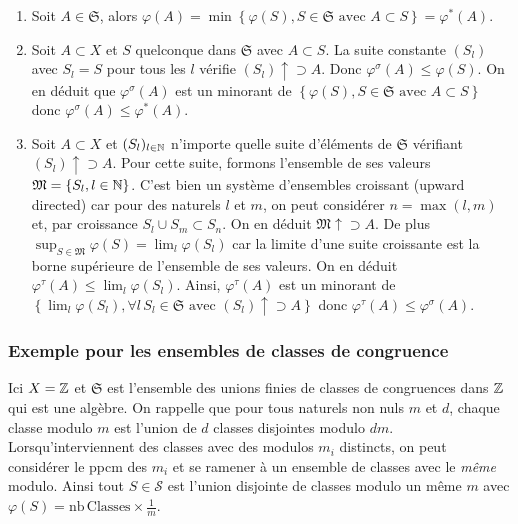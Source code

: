 \begin{demo}
 \begin{enumerate}
  \item Soit $A \in \mathfrak{S}$, alors $\varphi(A)= \min \left\lbrace \varphi(S), S \in \mathfrak{S} \text{ avec } A \subset S \right\rbrace = \varphi^*(A)$.
  \item Soit $A \subset X$ et $S$ quelconque dans $\mathfrak{S}$ avec $A \subset S$. La suite constante $(S_l)$ avec $S_l = S$ pour tous les $l$ vérifie $(S_l) \uparrow \supset A$. Donc $\varphi^\sigma(A) \leq \varphi(S)$. On en déduit que $\varphi^\sigma(A)$ est un minorant de $\left\lbrace \varphi(S), S \in \mathfrak{S} \text{ avec } A \subset S \right\rbrace$ donc $\varphi^\sigma(A) \leq \varphi^*(A)$.
  \item Soit $A \subset X$ et $(S_l)_{l\in \mathbb{N}}$ n'importe quelle suite d'éléments de $\mathfrak{S}$ vérifiant $(S_l) \uparrow \supset A$. Pour cette suite, formons l'ensemble de ses valeurs $\mathfrak{M}= \left\lbrace S_l, l\in \mathbb{N} \right\rbrace$. C'est bien un système d'ensembles croissant (upward directed) car pour des naturels $l$ et $m$, on peut considérer $n = \max(l,m)$ et, par croissance $S_l \cup S_m \subset S_n$. On en déduit $\mathfrak{M}\uparrow \supset A$. De plus $\sup_{S \in \mathfrak{M}} \varphi(S)=\lim_{l}  \varphi(S_l)$ car la limite d'une suite croissante est la borne supérieure de l'ensemble de ses valeurs. On en déduit $\varphi^\tau (A) \leq \lim_{l}  \varphi(S_l)$. Ainsi, $\varphi^\tau(A)$ est un minorant de $\left\lbrace \lim_{l}  \varphi(S_l), \forall l \, S_l\in \mathfrak{S} \text{ avec } (S_l) \uparrow \supset A \right\rbrace$ donc $\varphi^\tau(A) \leq \varphi^\sigma(A)$.
 \end{enumerate}

\end{demo}

\subsubsection{Exemple pour les ensembles de classes de congruence}
Ici $X= \mathbb{Z}$ et $\mathfrak{S}$ est l'ensemble des unions finies de classes de congruences dans $\mathbb{Z}$ qui est une algèbre. On rappelle que pour tous naturels non nuls $m$ et $d$, chaque classe modulo $m$ est l'union de $d$ classes disjointes modulo $dm$. Lorsqu'interviennent des classes avec des modulos $m_i$ distincts, on peut considérer le ppcm des $m_i$ et se ramener à un ensemble de classes avec le \emph{même} modulo. Ainsi tout $S\in \mathcal{S}$ est l'union disjointe de classes modulo un même $m$ avec $\varphi(S) = \mathrm{nb\, Classes}\times \frac{1}{m}$.

